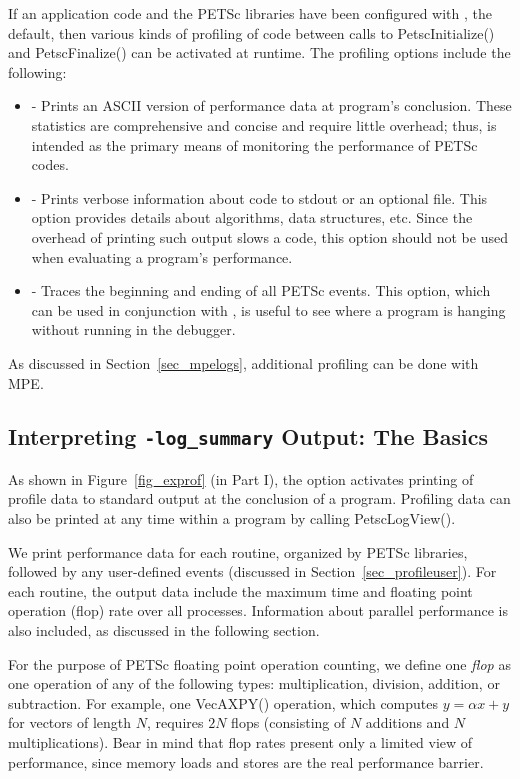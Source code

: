 If an application code and the PETSc libraries have been configured with
, the default,
then various kinds of profiling of code between calls to PetscInitialize() and PetscFinalize() can be
activated at runtime.  The profiling options include the following:
 
\begin{itemize}
\item {} - Prints an ASCII version of performance data
     at program's conclusion. These statistics are comprehensive and concise
     and require little overhead; thus,  is intended as
     the primary means of monitoring the performance of PETSc codes.
\item {} - Prints verbose information about code to
     stdout or an optional file. This option provides details about algorithms,
     data structures, etc. Since the overhead of printing such output slows a
     code, this option should not be used when evaluating a program's performance.
\item {} - Traces the beginning and ending of all
     PETSc events.  This option, which can be used in conjunction with
     , is useful to see where a program is hanging
     without running in the debugger.
\end{itemize}
 As discussed in Section~\ref{sec_mpelogs},
additional profiling can be done with MPE.

\subsection{Interpreting {\tt -log\_summary} Output: The Basics}
\label{sec_ploginfo}

As shown in Figure~\ref{fig_exprof} (in Part I), the option
  activates printing of profile
data to standard output at the conclusion of a program.  Profiling
data can also be printed at any time within a program by calling PetscLogView().

We print performance data for each routine, organized by PETSc
libraries, followed by any user-defined events (discussed in
Section~\ref{sec_profileuser}).  For each routine, the output data
include the maximum time and floating point operation (flop) rate over
all processes.  Information about parallel performance is also
included, as discussed in the following section.

For the purpose of PETSc floating point operation counting, we define
one {\em flop} as one operation of any of the following types:
multiplication, division, addition, or subtraction.  For example, one
VecAXPY() operation, which computes $y = \alpha x + y$ for
vectors of length $N$, requires $2N$ flops (consisting of $N$
additions and $N$ multiplications).  Bear in mind that flop rates
present only a limited view of performance, since memory loads and stores are
the real performance barrier.

